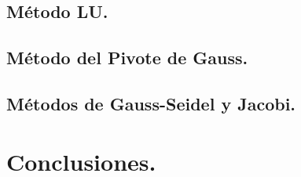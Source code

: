 \documentclass[12pt, notitlepage]{article}
\begin{document}
\subsection{Método LU.}



\newpage

\subsection{Método del Pivote de Gauss.}



\newpage

\subsection{Métodos de Gauss-Seidel y Jacobi.}



\newpage

\section{Conclusiones.}



\newpage

\begin{thebibliography}{3}



\end{thebibliography}
\end{document}
